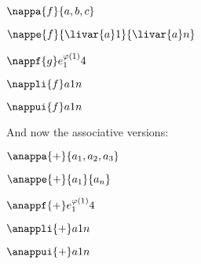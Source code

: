 \documentclass[minimal]{omdoc}
\begin{document}
$\nappa{f}{a,b,c}$

$\nappe{f}{\livar{a}1}{\livar{a}n}$

\newcommand\eph[1]{e_{#1}^{\varphi(#1)}}
$ \nappf{g}\eph14$

$\nappli{f}a1n$

$\nappui{f}a1n$

And now the associative versions:

$\anappa{+}{a_1,a_2,a_3}$

$\anappe{+}{a_1}{a_n}$

$\anappf{+}\eph14$

$\anappli{+}a1n$

$\anappui{+}a1n$
\end{document}
